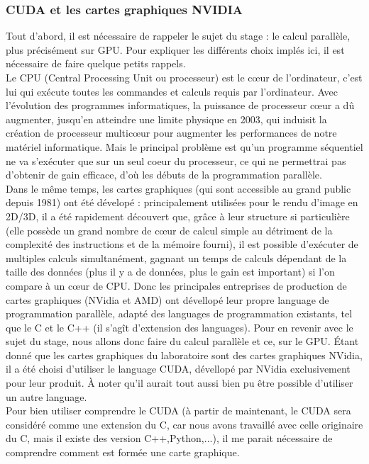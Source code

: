 \documentclass[a4paper,12pt]{article}
\begin{document}
{	\subsubsection{CUDA et les cartes graphiques NVIDIA}
	\indent Tout d'abord, il est n\'e{}cessaire de rappeler le sujet du stage : le calcul parall\`ele, plus pr\'e{}cis\'e{}ment sur GPU. Pour expliquer les diff\'e{}rents choix impl\'e{}s ici, il est n\'e{}cessaire de faire quelque petits rappels. \\
	\indent Le CPU (Central Processing Unit ou processeur) est le c\oe{}ur de l'ordinateur, c'est lui qui ex\'e{}cute toutes les commandes et calculs requis par l'ordinateur. Avec l'\'e{}volution des programmes informatiques, la puissance de processeur c\oe{}ur a d\^u augmenter, jusqu'en atteindre une limite physique en 2003, qui induisit la cr\'e{}ation de processeur multic\oe{}ur pour augmenter les performances de notre mat\'e{}riel informatique. Mais le principal probl\`eme est qu'un programme s\'e{}quentiel ne va s'ex\'e{}cuter que sur un seul coeur du processeur, ce qui ne permettrai pas d'obtenir de gain efficace, d'o\`u les d\'e{}buts de la programmation parall\`ele. \\
	\indent Dans le m\^eme temps, les cartes graphiques (qui sont accessible au grand public depuis 1981) ont \'e{}t\'e{} d\'e{}velop\'e{} : principalement utilis\'e{}es pour le rendu d'image en 2D/3D, il a \'e{}t\'e{} rapidement d\'e{}couvert que, gr\^ace \`a leur structure si particuli\`ere (elle poss\`ede un grand nombre de c\oe{}ur de calcul simple au d\'e{}triment de la complexit\'e{} des instructions et de la m\'e{}moire fourni), il est possible d'ex\'e{}cuter de multiples calculs simultan\'e{}ment, gagnant un temps de calculs d\'e{}pendant de la taille des donn\'e{}es (plus il y a de donn\'e{}es, plus le gain est important) si l'on compare à un c\oe{}ur de CPU. Donc les principales entreprises de production de cartes graphiques (NVidia et AMD) ont d\'e{}vellop\'e{} leur propre language de programmation parall\`ele, adapt\'e{} des languages de programmation existants, tel que le C et le C++ (il s'ag\^it d'extension des languages).
	\medbreak
	\indent Pour en revenir avec le sujet du stage, nous allons donc faire du calcul parall\`ele et ce, sur le GPU. \'E{}tant donn\'e que les cartes graphiques du laboratoire sont des cartes graphiques NVidia, il a \'e{}t\'e choisi d'utiliser le language CUDA, d\'e{}vellop\'e par NVidia exclusivement pour leur produit. \`A noter qu'il aurait tout aussi bien pu \^etre possible d'utiliser un autre language.
	\\ \indent Pour bien utiliser comprendre le CUDA (\`a partir de maintenant, le CUDA sera consid\'e{}r\'e{} comme une extension du C, car nous avons travaill\'e{} avec celle originaire du C, mais il existe des version C++,Python,...), il me parait n\'e{}cessaire de comprendre comment est form\'e{}e une carte graphique.
}
\end{document}
